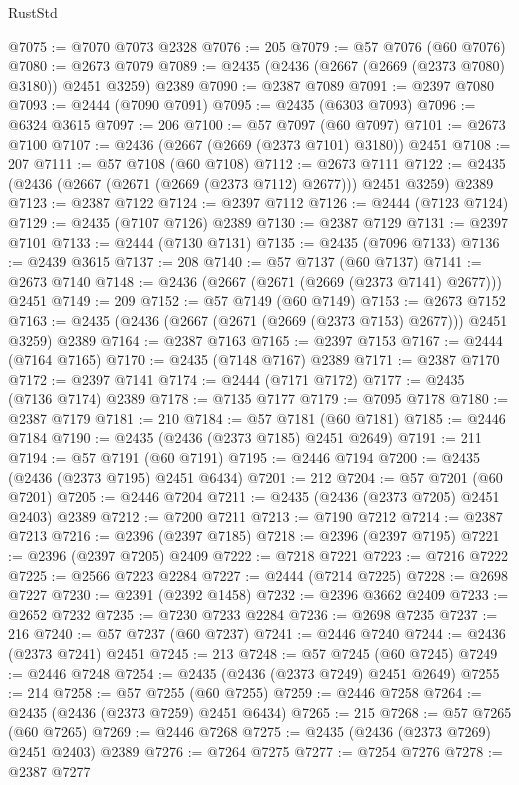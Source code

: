 \begin{lexlean}{RustStd}
\begin{coremodule}
@7075 := @7070 @7073 @2328
@7076 := 205
@7079 := @57 @7076 (@60 @7076)
@7080 := @2673 @7079
@7089 := @2435 (@2436 (@2667 (@2669 (@2373 @7080) @3180)) @2451 @3259) @2389
@7090 := @2387 @7089
@7091 := @2397 @7080
@7093 := @2444 (@7090 @7091)
@7095 := @2435 (@6303 @7093)
@7096 := @6324 @3615
@7097 := 206
@7100 := @57 @7097 (@60 @7097)
@7101 := @2673 @7100
@7107 := @2436 (@2667 (@2669 (@2373 @7101) @3180)) @2451
@7108 := 207
@7111 := @57 @7108 (@60 @7108)
@7112 := @2673 @7111
@7122 := @2435 (@2436 (@2667 (@2671 (@2669 (@2373 @7112) @2677))) @2451 @3259) @2389
@7123 := @2387 @7122
@7124 := @2397 @7112
@7126 := @2444 (@7123 @7124)
@7129 := @2435 (@7107 @7126) @2389
@7130 := @2387 @7129
@7131 := @2397 @7101
@7133 := @2444 (@7130 @7131)
@7135 := @2435 (@7096 @7133)
@7136 := @2439 @3615
@7137 := 208
@7140 := @57 @7137 (@60 @7137)
@7141 := @2673 @7140
@7148 := @2436 (@2667 (@2671 (@2669 (@2373 @7141) @2677))) @2451
@7149 := 209
@7152 := @57 @7149 (@60 @7149)
@7153 := @2673 @7152
@7163 := @2435 (@2436 (@2667 (@2671 (@2669 (@2373 @7153) @2677))) @2451 @3259) @2389
@7164 := @2387 @7163
@7165 := @2397 @7153
@7167 := @2444 (@7164 @7165)
@7170 := @2435 (@7148 @7167) @2389
@7171 := @2387 @7170
@7172 := @2397 @7141
@7174 := @2444 (@7171 @7172)
@7177 := @2435 (@7136 @7174) @2389
@7178 := @7135 @7177
@7179 := @7095 @7178
@7180 := @2387 @7179
@7181 := 210
@7184 := @57 @7181 (@60 @7181)
@7185 := @2446 @7184
@7190 := @2435 (@2436 (@2373 @7185) @2451 @2649)
@7191 := 211
@7194 := @57 @7191 (@60 @7191)
@7195 := @2446 @7194
@7200 := @2435 (@2436 (@2373 @7195) @2451 @6434)
@7201 := 212
@7204 := @57 @7201 (@60 @7201)
@7205 := @2446 @7204
@7211 := @2435 (@2436 (@2373 @7205) @2451 @2403) @2389
@7212 := @7200 @7211
@7213 := @7190 @7212
@7214 := @2387 @7213
@7216 := @2396 (@2397 @7185)
@7218 := @2396 (@2397 @7195)
@7221 := @2396 (@2397 @7205) @2409
@7222 := @7218 @7221
@7223 := @7216 @7222
@7225 := @2566 @7223 @2284
@7227 := @2444 (@7214 @7225)
@7228 := @2698 @7227
@7230 := @2391 (@2392 @1458)
@7232 := @2396 @3662 @2409
@7233 := @2652 @7232
@7235 := @7230 @7233 @2284
@7236 := @2698 @7235
@7237 := 216
@7240 := @57 @7237 (@60 @7237)
@7241 := @2446 @7240
@7244 := @2436 (@2373 @7241) @2451
@7245 := 213
@7248 := @57 @7245 (@60 @7245)
@7249 := @2446 @7248
@7254 := @2435 (@2436 (@2373 @7249) @2451 @2649)
@7255 := 214
@7258 := @57 @7255 (@60 @7255)
@7259 := @2446 @7258
@7264 := @2435 (@2436 (@2373 @7259) @2451 @6434)
@7265 := 215
@7268 := @57 @7265 (@60 @7265)
@7269 := @2446 @7268
@7275 := @2435 (@2436 (@2373 @7269) @2451 @2403) @2389
@7276 := @7264 @7275
@7277 := @7254 @7276
@7278 := @2387 @7277

\end{coremodule}
\end{lexlean}
